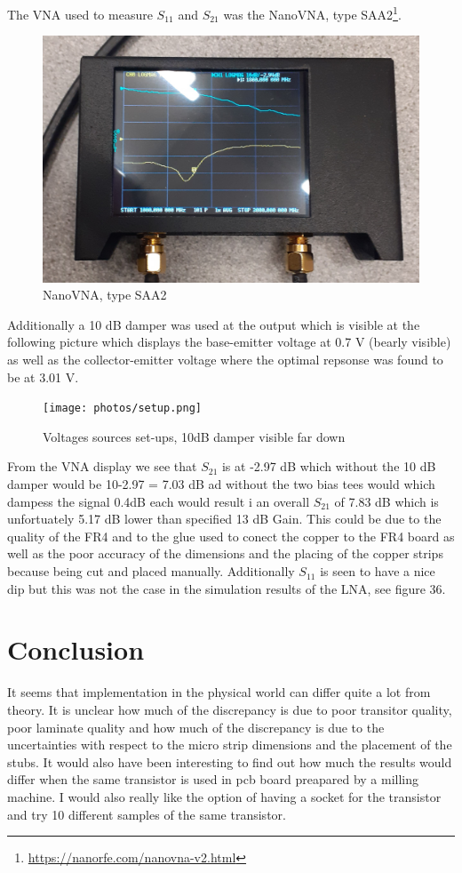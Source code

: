 \documentclass{article}
\begin{document}
The VNA used to measure $S_{11}$ and  $S_{21}$ was the NanoVNA, type SAA2\footnote{\url{https://nanorfe.com/nanovna-v2.html}}.
\begin{figure}[H]
\centering
  \includegraphics[scale=0.1]{photos/VNA.png}
  \caption{NanoVNA, type SAA2}
  \label{fig4}
\end{figure}
Additionally a 10 dB damper was used at the output which is visible at the following picture
which displays the base-emitter voltage at 0.7 V (bearly visible) as well as the collector-emitter
voltage where the optimal repsonse was found to be at 3.01 V.
\begin{figure}[H]
\centering
  \texttt{[image: photos/setup.png]}
  \caption{Voltages sources set-ups, 10dB damper visible far down}
  \label{fig4}
\end{figure}
From the VNA display we see that $S_{21}$ is at -2.97 dB which without the 10 dB damper would be
10-2.97 = 7.03 dB ad without the two bias tees would which dampess the signal 0.4dB each
would result i an overall $S_{21}$ of 7.83 dB which is unfortuately 5.17 dB lower than specified 13 dB Gain.
This could be due to the quality of the FR4 and to the glue used to conect the copper to the
FR4 board as well as the poor accuracy of the dimensions and the placing of the copper strips because being cut
and placed manually. Additionally $S_{11}$ is seen to have a nice dip but this was not the case
in the simulation results of the LNA, see figure 36. 

\section{Conclusion}
 It seems that implementation in the physical world
 can differ quite a lot from theory. It is unclear how much of the discrepancy is due to
poor transitor quality, poor laminate quality and how much of the discrepancy is due to the uncertainties with respect to the micro strip 
dimensions and the placement of the stubs. It would also have been interesting to find out
how much the results would differ when the same transistor is used in
pcb board preapared by a milling machine. I would also really like the option of having
a socket for the transistor and try 10 different samples of the same transistor.
\end{document}
